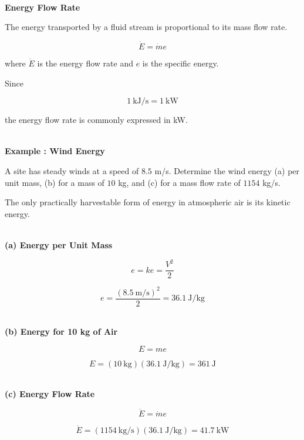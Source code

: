\documentclass[12pt]{article}
\begin{document}
\textbf{\\ Energy Flow Rate}

The energy transported by a fluid stream is proportional to its mass flow rate.

\begin{equation*}
\dot{E}
=
\dot{m}e
\end{equation*}

where $\dot{E}$ is the energy flow rate and $e$ is the specific energy.

Since

\begin{equation*}
1\ \text{kJ/s} = 1\ \text{kW}
\end{equation*}

the energy flow rate is commonly expressed in kW.

\textbf{\\ Example : Wind Energy}

A site has steady winds at a speed of $8.5$ m/s. Determine the wind energy (a) per unit mass, (b) for a mass of $10$ kg, and (c) for a mass flow rate of $1154$ kg/s.

The only practically harvestable form of energy in atmospheric air is its kinetic energy.

\textbf{\\ (a) Energy per Unit Mass}

\begin{equation*}
e
=
ke
=
\frac{V^2}{2}
\end{equation*}

\begin{equation*}
e
=
\frac{(8.5\ \text{m/s})^2}{2}
=
36.1\ \text{J/kg}
\end{equation*}

\textbf{\\ (b) Energy for 10 kg of Air}

\begin{equation*}
E
=
me
\end{equation*}

\begin{equation*}
E
=
(10\ \text{kg})(36.1\ \text{J/kg})
=
361\ \text{J}
\end{equation*}

\textbf{\\ (c) Energy Flow Rate}

\begin{equation*}
\dot{E}
=
\dot{m}e
\end{equation*}

\begin{equation*}
\dot{E}
=
(1154\ \text{kg/s})(36.1\ \text{J/kg})
=
41.7\ \text{kW}
\end{equation*}
\end{document}
